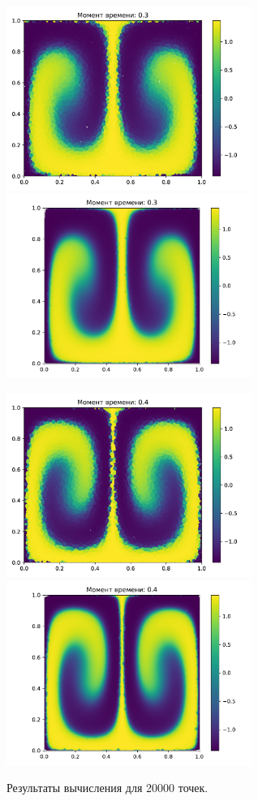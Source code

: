     \begin{figure}[H]
        \centering
        \includegraphics[width=8cm]{pictures/s15.png}
        \includegraphics[width=8cm]{pictures/p15.pdf}
    \end{figure}
    \begin{figure}[H]
        \centering
        \includegraphics[width=8cm]{pictures/s20.png}
        \includegraphics[width=8cm]{pictures/p20.pdf}
        \caption{Результаты вычисления для 20000 точек.} \label{res1}
    \end{figure}

